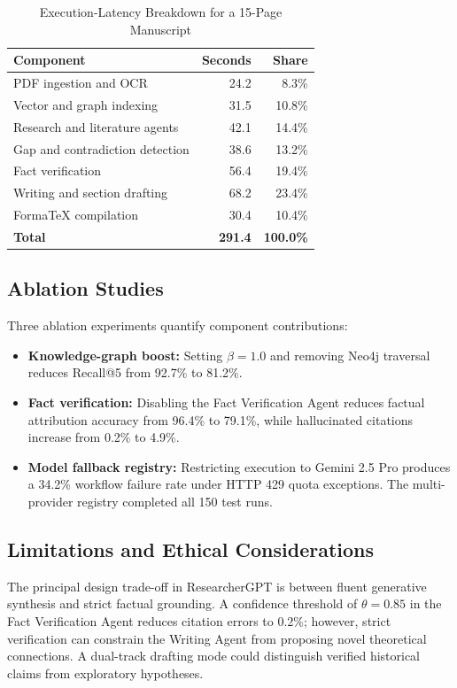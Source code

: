 \documentclass[conference]{IEEEtran}
\begin{document}
\begin{table}[!t]
\caption{Execution-Latency Breakdown for a 15-Page Manuscript}
\label{tab:latency_breakdown}
\centering
\scriptsize
\begin{tabular}{@{}p{}rr@{}}
\toprule
\textbf{Component} & \textbf{Seconds} & \textbf{Share} \\
\midrule
PDF ingestion and OCR & 24.2 & 8.3\% \\
Vector and graph indexing & 31.5 & 10.8\% \\
Research and literature agents & 42.1 & 14.4\% \\
Gap and contradiction detection & 38.6 & 13.2\% \\
Fact verification & 56.4 & 19.4\% \\
Writing and section drafting & 68.2 & 23.4\% \\
FormaTeX compilation & 30.4 & 10.4\% \\
\midrule
\textbf{Total} & \textbf{291.4} & \textbf{100.0\%} \\
\bottomrule
\end{tabular}
\end{table}

\subsection{Ablation Studies}
Three ablation experiments quantify component contributions:
\begin{itemize}
\item \textbf{Knowledge-graph boost:} Setting $\beta = 1.0$ and removing Neo4j traversal reduces Recall@5 from 92.7\% to 81.2\%.
\item \textbf{Fact verification:} Disabling the Fact Verification Agent reduces factual attribution accuracy from 96.4\% to 79.1\%, while hallucinated citations increase from 0.2\% to 4.9\%.
\item \textbf{Model fallback registry:} Restricting execution to Gemini 2.5 Pro produces a 34.2\% workflow failure rate under HTTP 429 quota exceptions. The multi-provider registry completed all 150 test runs.
\end{itemize}

\subsection{Limitations and Ethical Considerations}
The principal design trade-off in ResearcherGPT is between fluent generative synthesis and strict factual grounding. A confidence threshold of $\theta = 0.85$ in the Fact Verification Agent reduces citation errors to 0.2\%; however, strict verification can constrain the Writing Agent from proposing novel theoretical connections. A dual-track drafting mode could distinguish verified historical claims from exploratory hypotheses.
\end{document}
